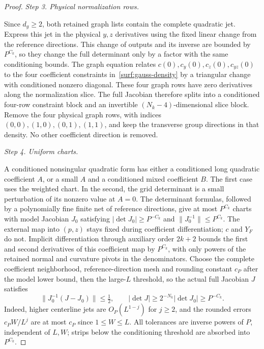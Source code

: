 \documentclass[11pt]{amsart}
\theoremstyle{definition}
\theoremstyle{remark}
\numberwithin{equation}{section}
\begin{document}
\begin{proof}
\par\medskip\noindent\textit{Step 3. Physical normalization rows.}\par\nobreak\smallskip

Since $d_g\ge2$, both retained graph lists contain the complete quadratic jet. Express this jet in the physical $y,z$ derivatives using the fixed linear change from the reference directions. This change of outputs and its inverse are bounded by $P^{C_k}$, so they change the full determinant only by a factor with the same conditioning bounds. The graph equation relates $c(0),c_y(0),c_z(0),c_{yz}(0)$ to the four coefficient constraints in~\eqref{surf:gauss-density} by a triangular change with conditioned nonzero diagonal. These four graph rows have zero derivatives along the normalization slice. The full Jacobian therefore splits into a conditioned four-row constraint block and an invertible $(N_k-4)$-dimensional slice block. Remove the four physical graph rows, with indices $(0,0),(1,0),(0,1),(1,1)$, and keep the transverse group directions in that density. No other coefficient direction is removed.

\par\medskip\noindent\textit{Step 4. Uniform charts.}\par\nobreak\smallskip

A conditioned nonsingular quadratic form has either a conditioned long quadratic coefficient $A$, or a small $A$ and a conditioned mixed coefficient $B$. The first case uses the weighted chart. In the second, the grid determinant is a small perturbation of its nonzero value at $A=0$. The determinant formulas, followed by a polynomially fine finite net of reference directions, give at most $P^{C_k}$ charts with model Jacobian $J_0$ satisfying $|\det J_0|\ge P^{-C_k}$ and $\|J_0^{-1}\|\le P^{C_k}$. The external map into $(p,z)$ stays fixed during coefficient differentiation; $c$ and $Y_F$ do not. Implicit differentiation through auxiliary order $2k+2$ bounds the first and second derivatives of this coefficient map by $P^{C_k}$, with only powers of the retained normal and curvature pivots in the denominators. Choose the complete coefficient neighborhood, reference-direction mesh and rounding constant $c_P$ after the model lower bound, then the large-$L$ threshold, so the actual full Jacobian $J$ satisfies
\[
 \|J_0^{-1}(J-J_0)\|\le\tfrac12,
 \qquad |\det J|\ge2^{-N_k}|\det J_0|\ge P^{-C_k}.
\]
Indeed, higher centerline jets are $O_P(L^{1-j})$ for $j\ge2$, and the rounded errors $c_PW/L^j$ are at most $c_P$ since $1\le W\le L$. All tolerances are inverse powers of $P$, independent of $L,W$; strips below the conditioning threshold are absorbed into $P^{C_k}$.
\end{proof}
\end{document}
